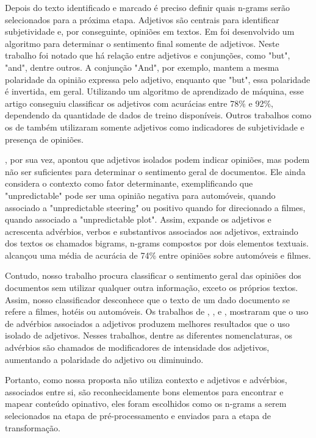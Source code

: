 \documentclass[template.tex]{subfiles}
\begin{document}
Depois do texto identificado e marcado é preciso definir quais n-grams serão selecionados para a próxima etapa. Adjetivos são centrais para identificar subjetividade e, por conseguinte, opiniões em textos. Em \cite{hatzivassiloglou2000effects} foi desenvolvido um algoritmo para determinar o sentimento final somente de adjetivos. Neste trabalho foi notado que há relação entre adjetivos e conjunções, como "but", "and", dentre outros. A conjunção "And", por exemplo, mantem a mesma polaridade da opinião expressa pelo adjetivo, enquanto que "but", essa polaridade é invertida, em geral. Utilizando um algoritmo de aprendizado de máquina, esse artigo conseguiu classificar os adjetivos com acurácias entre 78\% e 92\%, dependendo da quantidade de dados de treino disponíveis. Outros trabalhos como os de\cite{wiebe2000learning} também utilizaram somente adjetivos como indicadores de subjetividade e presença de opiniões.

\cite{turney2002thumbs}, por sua vez, apontou que adjetivos isolados podem indicar opiniões, mas podem não ser suficientes para determinar o sentimento geral de documentos. Ele ainda considera o contexto como fator determinante, exemplificando que "unpredictable" pode ser uma opinião negativa para automóveis, quando associado a "unpredictable steering" ou positivo quando for direcionado a filmes, quando associado a "unpredictable plot". Assim, \cite{turney2002thumbs} expande os adjetivos e acrescenta advérbios, verbos e substantivos associados aos adjetivos, extraindo dos textos os chamados bigrams, n-grams compostos por dois elementos textuais. \cite{turney2002thumbs} alcançou uma média de acurácia de 74\% entre opiniões sobre automóveis e filmes. 

Contudo, nosso trabalho procura classificar o sentimento geral das opiniões dos documentos sem utilizar qualquer outra informação, exceto os próprios textos. Assim, nosso classificador desconhece que o texto de um dado documento se refere a filmes, hotéis ou automóveis. Os trabalhos de \cite{wilson2005recognizing}, \cite{benamara2007sentiment}, \cite{taboada2008extracting} e \cite{taboada2011lexicon}, mostraram que o uso de advérbios associados a adjetivos produzem melhores resultados que o uso isolado de adjetivos. Nesses trabalhos, dentre as diferentes nomenclaturas, os advérbios são chamados de modificadores de intensidade dos adjetivos, aumentando a polaridade do adjetivo ou diminuindo. 

Portanto, como nossa proposta não utiliza contexto e adjetivos e advérbios, associados entre si, são reconhecidamente bons elementos para encontrar e mapear conteúdo opinativo, eles foram escolhidos como os n-grams a serem selecionados na etapa de pré-processamento e enviados para a etapa de transformação.
\end{document}
